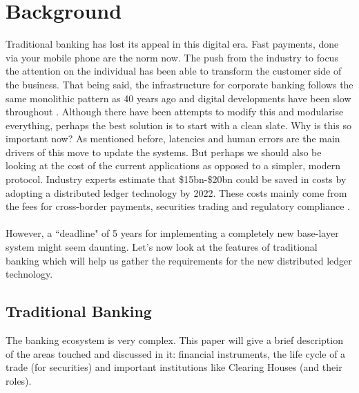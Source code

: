 \documentclass[12pt,twoside]{article}
\begin{document}
\newpage
\section{Background}
\label{sec:Background}
Traditional banking has lost its appeal in this digital era. Fast payments, done via your mobile phone are the norm now. The push from the industry to focus the attention on the individual has been able to transform the customer side of the business. That being said, the infrastructure for corporate banking follows the same monolithic pattern as 40 years ago and digital developments have been slow throughout \cite{slow}. Although there have been attempts to modify this and modularise everything, perhaps the best solution is to start with a clean slate. Why is this so important now? As mentioned before, latencies and human errors are the main drivers of this move to update the systems. But perhaps we should also be looking at the cost of the current applications as opposed to a simpler, modern protocol. Industry experts estimate that \$15bn-\$20bn could be saved in costs by adopting a distributed ledger technology by 2022. These costs mainly come from the fees for cross-border payments, securities trading and regulatory compliance \cite{Clearing:cost}.
\\ \\
However, a ``deadline" of 5 years for implementing a completely new base-layer system might seem daunting. Let's now look at the features of traditional banking which will help us gather the requirements for the new distributed ledger technology. 
\subsection{Traditional Banking}
\label{sub:TraditionalBanking}
The banking ecosystem is very complex. This paper will give a brief description of the areas touched and discussed in it: financial instruments, the life cycle of a trade (for securities) and important institutions like Clearing Houses (and their roles). 
\end{document}
